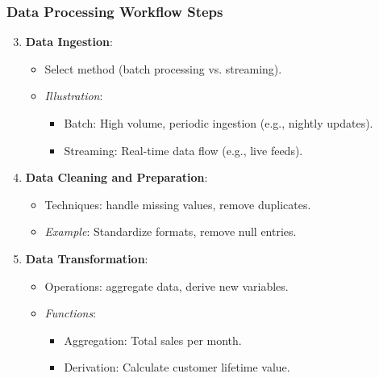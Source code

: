 \documentclass[aspectratio=169]{beamer}
\begin{document}
\begin{frame}[fragile]
    \frametitle{Data Processing Workflow Steps}
    \begin{enumerate}
        \setcounter{enumi}{2} %
        \item \textbf{Data Ingestion}:
        \begin{itemize}
            \item Select method (batch processing vs. streaming).
            \item \textit{Illustration}:
            \begin{itemize}
                \item Batch: High volume, periodic ingestion (e.g., nightly updates).
                \item Streaming: Real-time data flow (e.g., live feeds).
            \end{itemize}
        \end{itemize}
        
        \item \textbf{Data Cleaning and Preparation}:
        \begin{itemize}
            \item Techniques: handle missing values, remove duplicates.
            \item \textit{Example}: Standardize formats, remove null entries.
        \end{itemize}
    
        \item \textbf{Data Transformation}:
        \begin{itemize}
            \item Operations: aggregate data, derive new variables.
            \item \textit{Functions}:
            \begin{itemize}
                \item Aggregation: Total sales per month.
                \item Derivation: Calculate customer lifetime value.
            \end{itemize}
        \end{itemize}
    \end{enumerate}
\end{frame}
\end{document}
